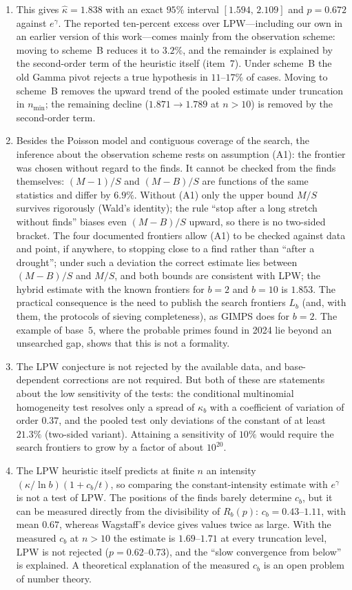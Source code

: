 \documentclass[11pt,a4paper]{article}
\theoremstyle{plain}
\theoremstyle{remark}
\newcommand{\Rb}{R_b}
\newcommand{\eg}{e^{\gamma}}
\begin{document}
\begin{enumerate}
\item This gives $\hat\kappa=1.838$ with an exact $95\%$ interval
$[1.594,\,2.109]$ and $p=0.672$ against $\eg$. The reported ten-percent excess
over LPW---including our own in an earlier version of this work---comes mainly
from the observation scheme: moving to scheme~B reduces it to $3.2\%$, and the
remainder is explained by the second-order term of the heuristic itself
(item~7). Under scheme~B the old Gamma pivot rejects a true hypothesis in
$11$--$17\%$ of cases. Moving to scheme~B removes the upward trend of the pooled
estimate under truncation in $n_{\min}$; the remaining decline
($1.871\to1.789$ at $n>10$) is removed by the second-order term.

\item Besides the Poisson model and contiguous coverage of the search, the
inference about the observation scheme rests on assumption (A1): the frontier
was chosen without regard to the finds. It cannot be checked from the finds
themselves: $(M-1)/S$ and $(M-B)/S$ are functions of the same statistics and
differ by $6.9\%$. Without (A1) only the upper bound $M/S$ survives rigorously
(Wald's identity); the rule ``stop after a long stretch without finds'' biases
even $(M-B)/S$ upward, so there is no two-sided bracket. The four documented
frontiers allow (A1) to be checked against data and point, if anywhere, to
stopping close to a find rather than ``after a drought''; under such a deviation
the correct estimate lies between $(M-B)/S$ and $M/S$, and both bounds are
consistent with LPW; the hybrid estimate with the known frontiers for $b=2$ and
$b=10$ is $1.853$. The practical consequence is the need to publish the search
frontiers $L_b$ (and, with them, the protocols of sieving completeness), as
GIMPS does for $b=2$. The example of base~$5$, where the probable primes found
in 2024 lie beyond an unsearched gap, shows that this is not a formality.

\item The LPW conjecture is not rejected by the available data, and
base-dependent corrections are not required. But both of these are statements
about the low sensitivity of the tests: the conditional multinomial homogeneity
test resolves only a spread of $\kappa_b$ with a coefficient of variation of
order $0.37$, and the pooled test only deviations of the constant of at least
$21.3\%$ (two-sided variant). Attaining a sensitivity of $10\%$ would require
the search frontiers to grow by a factor of about $10^{20}$.

\item The LPW heuristic itself predicts at finite $n$ an intensity
$(\kappa/\ln b)(1+c_b/t)$, so comparing the constant-intensity estimate with
$\eg$ is not a test of LPW. The positions of the finds barely determine $c_b$,
but it can be measured directly from the divisibility of $\Rb(p)$:
$c_b=0.43$--$1.11$, with mean $0.67$, whereas Wagstaff's device gives values
twice as large. With the measured $c_b$ at $n>10$ the estimate is $1.69$--$1.71$
at every truncation level, LPW is not rejected ($p=0.62$--$0.73$), and the ``slow
convergence from below'' is explained. A theoretical explanation of the measured
$c_b$ is an open problem of number theory.
\end{enumerate}
\end{document}
